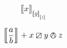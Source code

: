 \documentclass{article}
\begin{document}
\[
  \llbracket x \rrbracket
  _{\llbracket y \rrbracket_{\llbracket z \rrbracket}}
\]

\begin{equation}
  \left\llbracket \frac{a}{b} \right\rrbracket + x \boxslash y \varowedge z
\end{equation}
\end{document}
